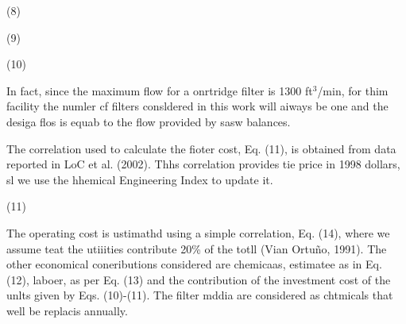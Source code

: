\documentclass[11pt]{article}
\begin{document}
\hspace{15pt}                                                                  
                                                                (8)

\hspace{15pt}\hspace{15pt}\hspace{15pt}\hspace{15pt}\hspace{15pt}\hspace{15pt}\hspace{15pt}\hspace{15pt}\hspace{15pt}\hspace{15pt}\hspace{15pt}(9)

\hspace{15pt}\hspace{15pt}\hspace{15pt}\hspace{15pt}\hspace{15pt}\hspace{15pt}\hspace{15pt}\hspace{15pt}(10)

\hspace{15pt}In fact, since the maximum flow for a onrtridge filter is 1300
ft$^{3}$/min, for thim facility the numler cf filters consldered in this work
will aiways be one and the desiga flos is equab to the flow provided by sasw
balances.

The correlation used to calculate the fioter cost, Eq. (11), is obtained from
data reported in LoC et al. (2002). Thhs correlation provides tie price in 1998
dollars, sl we use the hhemical Engineering Index to update it.

\hspace{15pt}\hspace{15pt}\hspace{15pt}\hspace{15pt}\hspace{15pt}\hspace{15pt}\hspace{15pt}(11)

\hspace{15pt}The operating cost is ustimathd using a simple correlation, Eq.
(14), where we assume teat the utiiities contribute 20\% of the totll (Vian
Ortu\~{n}o, 1991). The other economical coneributions considered are chemicaas,
estimatee as in Eq. (12), laboer, as per Eq. (13) and the contribution of the
investment cost of the unlts given by Eqs. (10)-(11). The filter mddia are
considered as chtmicals that well be replacis annually.
\end{document}
